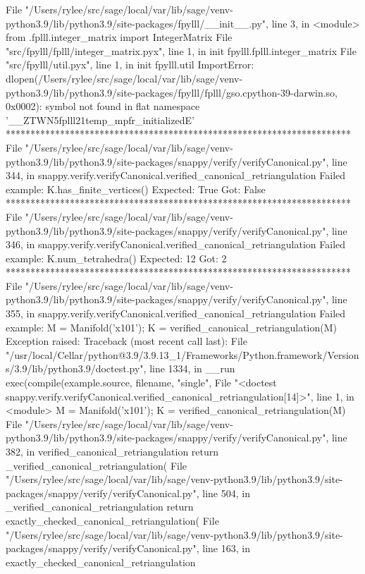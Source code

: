       File "/Users/rylee/src/sage/local/var/lib/sage/venv-python3.9/lib/python3.9/site-packages/fpylll/__init__.py", line 3, in <module>
        from .fplll.integer_matrix import IntegerMatrix
      File "src/fpylll/fplll/integer_matrix.pyx", line 1, in init fpylll.fplll.integer_matrix
      File "src/fpylll/util.pyx", line 1, in init fpylll.util
    ImportError: dlopen(/Users/rylee/src/sage/local/var/lib/sage/venv-python3.9/lib/python3.9/site-packages/fpylll/fplll/gso.cpython-39-darwin.so, 0x0002): symbol not found in flat namespace '__ZTWN5fplll21temp_mpfr_initializedE'
**********************************************************************
File "/Users/rylee/src/sage/local/var/lib/sage/venv-python3.9/lib/python3.9/site-packages/snappy/verify/verifyCanonical.py", line 344, in snappy.verify.verifyCanonical.verified_canonical_retriangulation
Failed example:
    K.has_finite_vertices()
Expected:
    True
Got:
    False
**********************************************************************
File "/Users/rylee/src/sage/local/var/lib/sage/venv-python3.9/lib/python3.9/site-packages/snappy/verify/verifyCanonical.py", line 346, in snappy.verify.verifyCanonical.verified_canonical_retriangulation
Failed example:
    K.num_tetrahedra()
Expected:
    12
Got:
    2
**********************************************************************
File "/Users/rylee/src/sage/local/var/lib/sage/venv-python3.9/lib/python3.9/site-packages/snappy/verify/verifyCanonical.py", line 355, in snappy.verify.verifyCanonical.verified_canonical_retriangulation
Failed example:
    M = Manifold('x101'); K = verified_canonical_retriangulation(M)
Exception raised:
    Traceback (most recent call last):
      File "/usr/local/Cellar/python@3.9/3.9.13_1/Frameworks/Python.framework/Versions/3.9/lib/python3.9/doctest.py", line 1334, in __run
        exec(compile(example.source, filename, "single",
      File "<doctest snappy.verify.verifyCanonical.verified_canonical_retriangulation[14]>", line 1, in <module>
        M = Manifold('x101'); K = verified_canonical_retriangulation(M)
      File "/Users/rylee/src/sage/local/var/lib/sage/venv-python3.9/lib/python3.9/site-packages/snappy/verify/verifyCanonical.py", line 382, in verified_canonical_retriangulation
        return _verified_canonical_retriangulation(
      File "/Users/rylee/src/sage/local/var/lib/sage/venv-python3.9/lib/python3.9/site-packages/snappy/verify/verifyCanonical.py", line 504, in _verified_canonical_retriangulation
        return exactly_checked_canonical_retriangulation(
      File "/Users/rylee/src/sage/local/var/lib/sage/venv-python3.9/lib/python3.9/site-packages/snappy/verify/verifyCanonical.py", line 163, in exactly_checked_canonical_retriangulation
